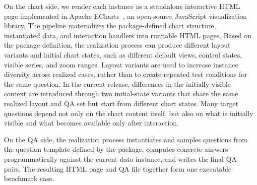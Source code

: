 \documentclass[review,journal,hideappendix]{vgtc} %
\newcommand{\placeholder}[1]{\textcolor{red}{\textbf{[Placeholder: #1]}}}
\begin{document}
On the chart side, we render each instance as a standalone interactive HTML page implemented in Apache ECharts~\cite{liEChartsDeclarativeFramework2018}, an open-source JavaScript visualization library. The pipeline materializes the package-defined chart structure, instantiated data, and interaction handlers into runnable HTML pages. Based on the package definition, the realization process can produce different layout variants and initial chart states, such as different default views, control states, visible series, and zoom ranges. 
Layout variants are used to increase instance diversity across realized cases, rather than to create repeated test conditions for the same question. In the current release, differences in the initially visible context are introduced through two initial-state variants that share the same realized layout and QA set but start from different chart states.
Many target questions depend not only on the chart content itself, but also on what is initially visible and what becomes available only after interaction.

On the QA side, the realization process instantiates and samples questions from the question template defined by the package, computes concrete answers programmatically against the current data instance, and writes the final QA pairs. The resulting HTML page and QA file together form one executable benchmark case.
\end{document}
